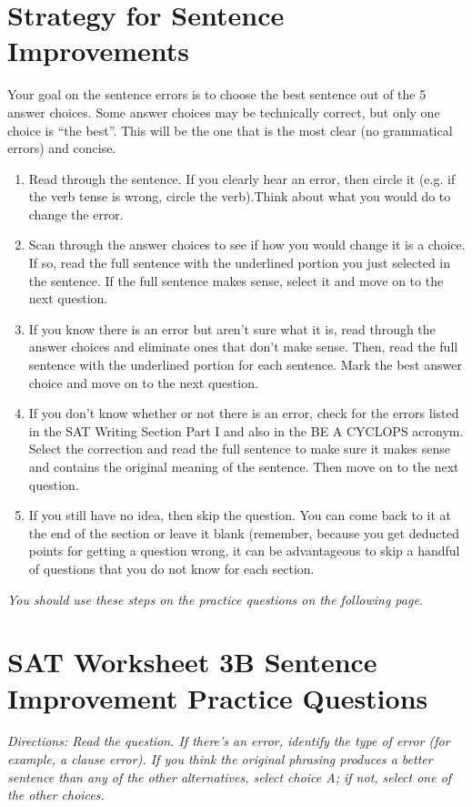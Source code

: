 \section[Sentence Improvement]{Strategy for Sentence Improvements}
Your goal on the sentence errors is to choose the best sentence out of the 5 answer choices. Some answer choices may be technically correct, but only one choice is “the best”. This will be the one that is the most clear (no grammatical errors) and concise. 

\begin{center}
\begin{enumerate}
\item{Read through the sentence. If you clearly hear an error, then circle it (e.g. if the verb tense is wrong, circle the verb).Think about what you would do to change the error. }
\item{Scan through the answer choices to see if how you would change it is a choice. If so, read the full sentence with the underlined portion you just selected in the sentence. If the full sentence makes sense, select it and move on to the next question. }
\item{If you know there is an error but aren't sure what it is, read through the answer choices and eliminate ones that don't make sense. Then, read the full sentence with the underlined portion for each sentence. Mark the best answer choice and move on to the next question.} 
\item{If you don't know whether or not there is an error, check for the errors listed in the SAT Writing Section Part I and also in the BE A CYCLOPS acronym.\\
Select the correction and read the full sentence to make sure it makes sense and contains the original meaning of the sentence.  Then move on to the next question.  }
\item{If you still have no idea, then skip the question. You can come back to it at the end of the section or leave it blank (remember, because you get deducted points for getting a question wrong, it can be advantageous to skip a handful of questions that you do not know for each section. }
\end{enumerate}
\end{center}

\bigskip
\textit{You should use these steps on the practice questions on the following page.}
\pagebreak

\section[Sentence Improvement Practice]{SAT Worksheet 3B Sentence Improvement Practice Questions}
\textit{Directions: Read the question. If there's an error, identify the type of error (for example, a clause error). If you think the original phrasing produces a better sentence than any of the other alternatives, select choice A; if not, select one of the other choices.}

